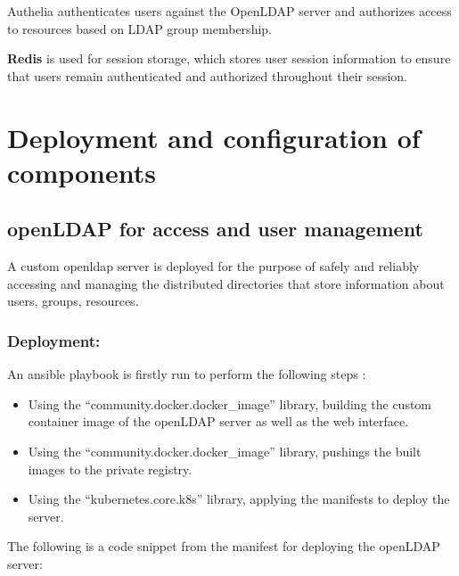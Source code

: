 Authelia authenticates users against the OpenLDAP server and authorizes access to resources based on LDAP group membership. 

\textbf{Redis} is used for session storage, which stores user session information to ensure that users remain authenticated and authorized throughout their session. 

 

\section{Deployment and configuration of components }

\subsection{openLDAP for access and user management  }

A custom openldap server is deployed for the purpose of safely and reliably accessing and managing the distributed directories that store information about users, groups, resources. 

\subsubsection{Deployment: }

An ansible playbook is firstly run to perform the following steps : 
\begin{itemize}[label={--}]
\item Using the “community.docker.docker\_image” library, building the custom container image of the openLDAP server as well as the web interface. 
\item Using the “community.docker.docker\_image” library, pushings the built images to the private registry. 
\item Using the “kubernetes.core.k8s” library, applying the manifests to deploy the server. 
\end{itemize}

The following is a code snippet from the manifest for deploying the openLDAP server: 

\begin{listing}[H]
\inputminted[firstline=1,lastline=10]{Yaml}{codeListing/deploy_openldap.yml}
\end{listing} 

\begin{listing}[H]
\inputminted[firstline=16,lastline=55]{Yaml}{codeListing/deploy_openldap.yml}
\end{listing} 

